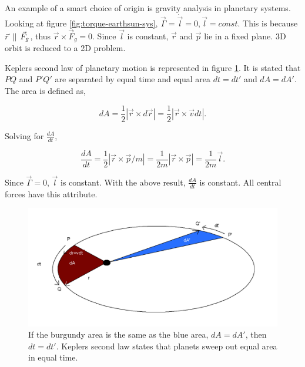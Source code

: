 An example of a smart choice of origin is gravity analysis in planetary systems. Looking at figure \ref{fig:torque-earthsun-sys}, $\vec{\Gamma} = \dot{\vec{l}} = 0, \vec{l} = const.$ This is because $\vec{r} \hspace{1ex} || \hspace{1ex} \vec{F}_g$, thus $\vec{r} \times \vec{F}_g = 0$. Since $\vec{l}$ is constant, $\vec{r}$ and $\vec{p}$ lie in a fixed plane. 3D orbit is reduced to a 2D problem.

Keplers second law of planetary motion is represented in figure \ref{fig:keplers2nd}. It is stated that $PQ$ and $P'Q'$ are separated by equal time and equal area $dt = dt'$ and $dA = dA'$. The area is defined as,

\begin{equation*}
    dA = \frac{1}{2} |\vec{r} \times d\vec{r}| = \frac{1}{2} |\vec{r} \times \vec{v}dt|.
\end{equation*}

Solving for $\frac{dA}{dt}$,

\begin{equation*}
    \frac{dA}{dt} = \frac{1}{2}|\vec{r} \times \vec{p}/m| = \frac{1}{2m}|\vec{r} \times \vec{p}| = \frac{1}{2m}\vec{l}.
\end{equation*}

Since $\vec{\Gamma} = 0$, $\vec{l}$ is constant. With the above result, $\frac{dA}{dt}$ is constant. All central forces have this attribute.

\begin{figure}[h]
    \centering
    \includegraphics[width=13cm]{Classical_Mechanics/2.6-angular-momentum/keplers2nd.png}
    \caption{If the burgundy area is the same as the blue area, $dA = dA'$, then $dt = dt'$. Keplers second law states that planets sweep out equal area in equal time.}
    \label{fig:keplers2nd}
\end{figure}

